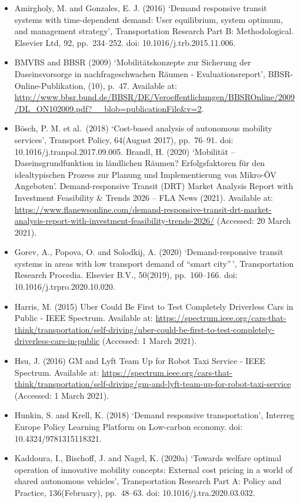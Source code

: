 \documentclass[
]{book}
\providecommand{\tightlist}{%
  \setlength{\itemsep}{0pt}\setlength{\parskip}{0pt}}
\begin{document}
\begin{itemize}
\tightlist
\item
  Amirgholy, M. and Gonzales, E. J. (2016) `Demand responsive transit systems with time-dependent demand: User equilibrium, system optimum, and management strategy', Transportation Research Part B: Methodological. Elsevier Ltd, 92, pp.~234--252. doi: 10.1016/j.trb.2015.11.006.
\item
  BMVBS and BBSR (2009) `Mobilitätskonzepte zur Sicherung der Daseinsvorsorge in nachfrageschwachen Räumen - Evaluationsreport', BBSR-Online-Publikation, (10), p.~47. Available at: \url{http://www.bbsr.bund.de/BBSR/DE/Veroeffentlichungen/BBSROnline/2009/DL_ON102009.pdf?__blob=publicationFile\&v=2}.
\item
  Bösch, P. M. et al.~(2018) `Cost-based analysis of autonomous mobility services', Transport Policy, 64(August 2017), pp.~76--91. doi: 10.1016/j.tranpol.2017.09.005.
  Brandl, H. (2020) `Mobilität -- Daseinsgrundfunktion in ländlichen Räumen? Erfolgsfaktoren für den idealtypischen Prozess zur Planung und Implementierung von Mikro-ÖV Angeboten'.
  Demand-responsive Transit (DRT) Market Analysis Report with Investment Feasibility \& Trends 2026 -- FLA News (2021). Available at: \url{https://www.flanewsonline.com/demand-responsive-transit-drt-market-analysis-report-with-investment-feasibility-trends-2026/} (Accessed: 20 March 2021).
\item
  Gorev, A., Popova, O. and Solodkij, A. (2020) `Demand-responsive transit systems in areas with low transport demand of ``smart city''\,', Transportation Research Procedia. Elsevier B.V., 50(2019), pp.~160--166. doi: 10.1016/j.trpro.2020.10.020.
\item
  Harris, M. (2015) Uber Could Be First to Test Completely Driverless Cars in Public - IEEE Spectrum. Available at: \url{https://spectrum.ieee.org/cars-that-think/transportation/self-driving/uber-could-be-first-to-test-completely-driverless-cars-in-public} (Accessed: 1 March 2021).
\item
  Hsu, J. (2016) GM and Lyft Team Up for Robot Taxi Service - IEEE Spectrum. Available at: \url{https://spectrum.ieee.org/cars-that-think/transportation/self-driving/gm-and-lyft-team-up-for-robot-taxi-service} (Accessed: 1 March 2021).
\item
  Hunkin, S. and Krell, K. (2018) `Demand responsive transportation', Interreg Europe Policy Learning Platform on Low-carbon economy. doi: 10.4324/9781315118321.
\item
  Kaddoura, I., Bischoff, J. and Nagel, K. (2020a) `Towards welfare optimal operation of innovative mobility concepts: External cost pricing in a world of shared autonomous vehicles', Transportation Research Part A: Policy and Practice, 136(February), pp.~48--63. doi: 10.1016/j.tra.2020.03.032.

\end{itemize}
\end{document}
